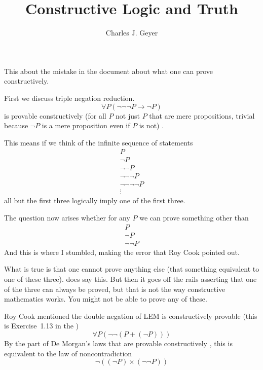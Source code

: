 \documentclass[11pt]{article}
\begin{document}
\title{Constructive Logic and Truth}

\author{Charles J. Geyer}

\maketitle

This about the mistake in the document about what one can prove constructively.

First we discuss triple negation reduction.
$$
   \forall P (\neg \neg \neg P \to \neg P)
$$
is provable constructively
(for all $P$ not just $P$ that are mere propositions, trivial because
$\neg P$ is a mere proposition even if $P$ is not)
\citep[Exercise~1.11 in][hereinafter referred to as the HoTT book]{hott-book}.

This means if we think of the infinite sequence of statements
\begin{gather*}
   P
   \\
   \neg P
   \\
   \neg \neg P
   \\
   \neg \neg \neg P
   \\
   \neg \neg \neg \neg P
   \\
   \vdots
\end{gather*}
all but the first three logically imply one of the first three.

The question now arises whether for any $P$ we can prove something other
than
\begin{gather*}
   P
   \\
   \neg P
   \\
   \neg \neg P
\end{gather*}
And this is where I stumbled, making the error that Roy Cook pointed out.

What is true is that one cannot prove anything else (that something equivalent
to one of these three).  \citet{geyer-survey} does say this.
But then it goes off the rails asserting that one of the three can always
be proved, but that is not the way constructive mathematics works.  You
might not be able to prove any of these.

Roy Cook mentioned the double negation of LEM is constructively
provable (this is Exercise~{1.13} in the )
\begin{equation} \label{eq:double-negation-lem}
   \forall P (\neg \neg (P + (\neg P)))
\end{equation}
By the part of De Morgan's laws that are provable constructively
, this is equivalent to the
law of noncontradiction
\citep[Section~1.1]{bauer-constructive}
\begin{equation} \label{eq:noncontradiction}
   \neg ((\neg P) \times (\neg \neg P))
\end{equation}
\end{document}
